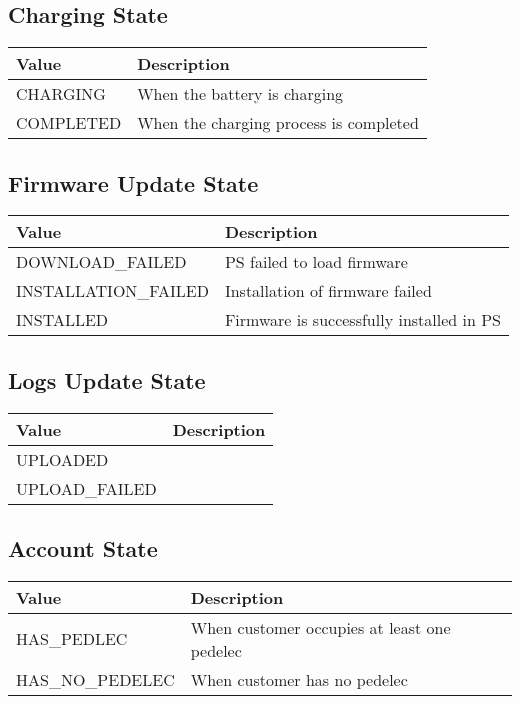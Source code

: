 \subsection{Charging State}
\label{types:ChargingState}

\begin{tabularx}{\linewidth}{ | l | X | }
  \hline
  \rowcolor{table-head}
  Value & Description \\
  \hline
  CHARGING 		& When the battery is charging\\
  COMPLETED 	& When the charging process is completed \\
  \hline
\end{tabularx}

\subsection{Firmware Update State}
\label{types:FirmwareState}

\begin{tabularx}{\linewidth}{ | l | X | }
  \hline
  \rowcolor{table-head}
  Value & Description \\
  \hline
  DOWNLOAD\_FAILED & \acs{PS} failed to load firmware \\
  INSTALLATION\_FAILED & Installation of firmware failed \\
  INSTALLED & Firmware is successfully installed in \acs{PS} \\
  \hline
\end{tabularx}

\subsection{Logs Update State}
\label{types:LogUpdateState}

\begin{tabularx}{\linewidth}{ | l | X | }
  \hline
  \rowcolor{table-head}
  Value & Description \\
  \hline
  UPLOADED 		&  \\
  UPLOAD\_FAILED 	&  \\
  \hline
\end{tabularx}

\subsection{Account State}
\label{types:AccountState}

\begin{tabularx}{\linewidth}{ | l | X | }
  \hline
  \rowcolor{table-head}
  Value & Description \\
  \hline
  HAS\_PEDLEC 		& When customer occupies at least one pedelec \\
  HAS\_NO\_PEDELEC 	& When customer has no pedelec  \\
  \hline
\end{tabularx}

